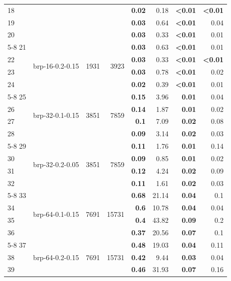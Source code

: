 \begin{longtable}{lrr@{\hskip 12pt}r@{\hskip 12pt}r@{\hskip 12pt}r@{\hskip 12pt}r@{\hskip 12pt}r}
18 &  &  &  & \textbf{0.02} & 0.18 & \textbf{<0.01} & \textbf{<0.01} \\
19 &  &  &  & \textbf{0.03} & 0.64 & \textbf{<0.01} & 0.04 \\
20 &  &  &  & \textbf{0.03} & 0.33 & \textbf{<0.01} & 0.01 \\
\cmidrule{5-8}
21 & \multirow{4}{*}{brp-16-0.2-0.15} & \multirow{4}{*}{1931} & \multirow{4}{*}{3923} & \textbf{0.03} & 0.63 & \textbf{<0.01} & 0.01 \\
22 &  &  &  & \textbf{0.03} & 0.33 & \textbf{<0.01} & \textbf{<0.01} \\
23 &  &  &  & \textbf{0.03} & 0.78 & \textbf{<0.01} & 0.02 \\
24 &  &  &  & \textbf{0.02} & 0.39 & \textbf{<0.01} & 0.01 \\
\cmidrule{5-8}
25 & \multirow{4}{*}{brp-32-0.1-0.15} & \multirow{4}{*}{3851} & \multirow{4}{*}{7859} & \textbf{0.15} & 3.96 & \textbf{0.01} & 0.04 \\
26 &  &  &  & \textbf{0.14} & 1.87 & \textbf{0.01} & 0.02 \\
27 &  &  &  & \textbf{0.1} & 7.09 & \textbf{0.02} & 0.08 \\
28 &  &  &  & \textbf{0.09} & 3.14 & \textbf{0.02} & 0.03 \\
\cmidrule{5-8}
29 & \multirow{4}{*}{brp-32-0.2-0.05} & \multirow{4}{*}{3851} & \multirow{4}{*}{7859} & \textbf{0.11} & 1.76 & \textbf{0.01} & 0.14 \\
30 &  &  &  & \textbf{0.09} & 0.85 & \textbf{0.01} & 0.02 \\
31 &  &  &  & \textbf{0.12} & 4.24 & \textbf{0.02} & 0.09 \\
32 &  &  &  & \textbf{0.11} & 1.61 & \textbf{0.02} & 0.03 \\
\cmidrule{5-8}
33 & \multirow{4}{*}{brp-64-0.1-0.15} & \multirow{4}{*}{7691} & \multirow{4}{*}{15731} & \textbf{0.68} & 21.14 & \textbf{0.04} & 0.1 \\
34 &  &  &  & \textbf{0.6} & 10.78 & \textbf{0.04} & 0.04 \\
35 &  &  &  & \textbf{0.4} & 43.82 & \textbf{0.09} & 0.2 \\
36 &  &  &  & \textbf{0.37} & 20.56 & \textbf{0.07} & 0.1 \\
\cmidrule{5-8}
37 & \multirow{4}{*}{brp-64-0.2-0.15} & \multirow{4}{*}{7691} & \multirow{4}{*}{15731} & \textbf{0.48} & 19.03 & \textbf{0.04} & 0.11 \\
38 &  &  &  & \textbf{0.42} & 9.44 & \textbf{0.03} & 0.04 \\
39 &  &  &  & \textbf{0.46} & 31.93 & \textbf{0.07} & 0.16 \\

\end{longtable}
